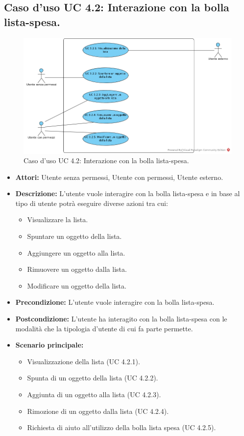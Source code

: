 \subsection{Caso d'uso UC 4.2: Interazione con la bolla lista-spesa.}
\label{Caso d'uso UC 4.2: Interazione con la bolla lista-spesa.}
\begin{figure}[ht]
	\centering
	\includegraphics[scale=0.60]{Usecases/img/UC4.2.png}
	\caption{Caso d'uso UC 4.2: Interazione con la bolla lista-spesa.}
\end{figure}

\FloatBarrier
\begin{itemize}
\item \textbf{Attori:} Utente senza permessi, Utente con permessi, Utente esterno.
\item \textbf{Descrizione:} L'utente vuole interagire con la bolla lista-spesa e in base al tipo di utente potrà eseguire diverse azioni tra cui:
\begin{itemize}
\item Visualizzare la lista.
\item Spuntare un oggetto della lista.
\item Aggiungere un oggetto alla lista.
\item Rimuovere un oggetto dalla lista.
\item Modificare un oggetto della lista.
\end{itemize}
\item \textbf{Precondizione:} L'utente vuole interagire con la bolla lista-spesa. 
\item \textbf{Postcondizione:} L'utente ha interagito con la bolla lista-spesa con le modalità che la tipologia d'utente di cui fa parte permette.
\item \textbf{Scenario principale:}
	\begin{itemize}
	\item{Visualizzazione della lista (UC 4.2.1).}
	\item{Spunta di un oggetto della lista (UC 4.2.2).}
	\item{Aggiunta di un oggetto alla lista (UC 4.2.3).}
	\item{Rimozione di un oggetto dalla lista (UC 4.2.4).}
	\item{Richiesta di aiuto all'utilizzo della bolla lista spesa (UC 4.2.5).}
	\end{itemize}
\end{itemize}